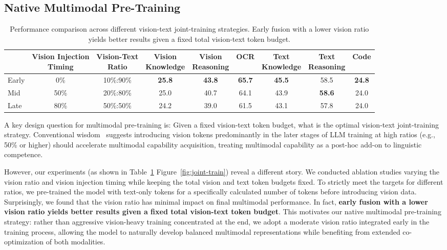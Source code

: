 \documentclass{article}
\newcommand{\citep}[1]{\parencite{#1}}
\begin{document}
\subsection{Native Multimodal Pre-Training} \label{sec:joint-pre}

\begin{table}[h]
\centering
\caption{Performance comparison across different vision-text joint-training strategies. Early fusion with a lower vision ratio yields better results given a fixed total vision-text token budget.}
\begin{tabular}{lcc|cccccc}
\toprule
 & \shortstack{Vision Injection\\Timing} & \shortstack{Vision-Text\\Ratio} & \shortstack{Vision\\Knowledge} & \shortstack{Vision\\Reasoning} & \shortstack{OCR\\~} & \shortstack{Text\\Knowledge} & \shortstack{Text\\Reasoning} & \shortstack{Code\\~} \\
\midrule
Early & 0\% & 10\%:90\% & \textbf{25.8} & \textbf{43.8} & \textbf{65.7} & \textbf{45.5} & 58.5 & \textbf{24.8} \\
Mid   & 50\% & 20\%:80\% & 25.0 & 40.7 & 64.1 & 43.9 & \textbf{58.6} & 24.0 \\
Late  & 80\% & 50\%:50\% & 24.2 & 39.0 & 61.5 & 43.1 & 57.8 & 24.0 \\
\bottomrule
\end{tabular}
\label{tab:joint-train}
\end{table}

A key design question for multimodal pre-training is: Given a fixed vision-text token budget, what is the optimal vision-text joint-training strategy. Conventional wisdom~\citep{bai2025qwen3vltechnicalreport,guo2025seed15vltechnicalreport} suggests introducing vision tokens predominantly in the later stages of LLM training at high ratios (e.g., 50\% or higher) should accelerate multimodal capability acquisition, treating multimodal capability as a post-hoc add-on to linguistic competence.

However, our experiments (as shown in Table~\ref{tab:joint-train} Figure~\ref{fig:joint-train}) reveal a different story. We conducted ablation studies varying the vision ratio and vision injection timing while keeping the total vision and text token budgets fixed. To strictly meet the targets for different ratios, we pre-trained the model with text-only tokens for a specifically calculated number of tokens before introducing vision data. Surprisingly, we found that the vision ratio has minimal impact on final multimodal performance. In fact, \textbf{early fusion with a lower vision ratio yields better results given a fixed total vision-text token budget}. 
This motivates our native multimodal pre-training strategy: rather than aggressive vision-heavy training concentrated at the end, we adopt a moderate vision ratio integrated early in the training process, allowing the model to naturally develop balanced multimodal representations while benefiting from extended co-optimization of both modalities.
\end{document}

